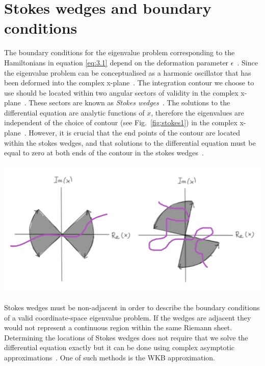 \documentclass[12pt, a4paper]{report}
\newenvironment{Figure}
    {\par\medskip\noindent\minipage{\linewidth}}
    {\endminipage\par\medskip}
\begin{document}
\section{Stokes wedges and boundary conditions}\label{Stokes}
The boundary conditions for the eigenvalue problem corresponding to the Hamiltonians in equation \ref{eq:3.1} depend on the deformation parameter $\epsilon$~\cite{MakingSense}. Since the eigenvalue problem can be conceptualised as a harmonic oscillator that has been deformed into the complex x-plane~\cite{AnalyticContinuation}. The integration contour we choose to use should be located within two angular sectors of validity in the complex x-plane~\cite{BenderOrszag}. These sectors are known as \emph{Stokes wedges}~\cite{MakingSense}. The solutions to the differential equation are analytic functions of $x$, therefore the eigenvalues are independent of the choice of contour (see Fig.~\ref{fig:stokes1}) in the complex x-plane~\cite{PTsymmetricQM, Sorrell}. However, it is crucial that the end points of the contour are located within the stokes wedges, and that solutions to the differential equation must be equal to zero at both ends of the contour in the stokes wedges~\cite{Faria1}. 
\begin{Figure}
\centering
\includegraphics[width=.9\linewidth]{stokes1.pdf}
\label{fig:stokes1}
\end{Figure}
Stokes wedges must be non-adjacent in order to describe the boundary conditions of a valid coordinate-space eigenvalue problem. If the wedges are adjacent they would not represent a continuous region within the same Riemann sheet.
Determining the locations of Stokes wedges does not require that we solve the differential equation exactly but it can be done using complex asymptotic approximations~\cite{PTsymmetricQM}. One of such methods is the WKB approximation. 
\end{document}
